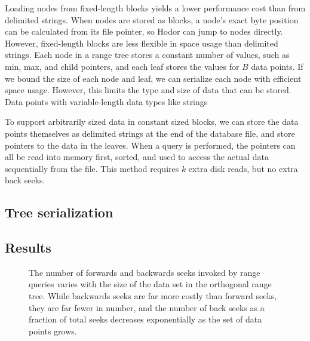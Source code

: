 \documentclass[11pt, oneside]{article}
\begin{document}
Loading nodes from fixed-length blocks yields a lower performance cost than
from delimited strings. When nodes are stored as blocks, a node's exact byte
position can be calculated from its file pointer, so Hodor can jump to nodes
directly. However, fixed-length blocks are less flexible in space usage than
delimited strings. Each node in a range tree stores a constant number of
values, such as min, max, and child pointers, and each leaf stores the values
for $B$ data points. If we bound the size of each node and leaf, we can
serialize each node with efficient space usage. However, this limits the type
and size of data that can be stored. Data points with variable-length data types
like strings

To support arbitrarily sized data in constant sized blocks, we can store the
data points themselves as delimited strings at the end of the database file, and
store pointers to the data in the leaves. When a query is performed, the
pointers can all be read into memory first, sorted, and used to access the
actual data sequentially from the file. This method requires $k$ extra disk
reads, but no extra back seeks.


\subsection{Tree serialization}


\subsection{Results}

\begin{figure}[b!]
\centering
{}%
\caption{
    The number of forwards and backwards seeks invoked by range queries varies
    with the size of the data set in the orthogonal range tree. While
    backwards seeks are far more costly than forward seeks, they are far
    fewer in number, and the number of back seeks as a fraction of total seeks
    decreases exponentially as the set of data points grows.
}
\label{fig:figure2}
\end{figure}
\end{document}
